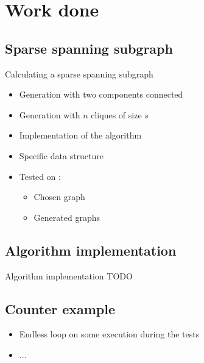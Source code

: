 \section{Work done}

\subsection{Sparse spanning subgraph}
\begin{frame}{Calculating a sparse spanning subgraph}
	\begin{itemize}
		\item Generation with two components connected
		\item Generation with $n$ cliques of size $s$
	\end{itemize}

	\begin{itemize}
		\item Implementation of the algorithm
		\item Specific data structure
		\item Tested on :
			\begin{itemize}
				\item Chosen graph
				\item Generated graphs
			\end{itemize}
	\end{itemize}
\end{frame}

\subsection{Algorithm implementation}
\begin{frame}{Algorithm implementation}
  TODO
\end{frame}

\subsection{Counter example}
\begin{frame}
  \begin{itemize}
  \item Endless loop on some execution during the tests
  \item ...
  \end{itemize}
\end{frame}


